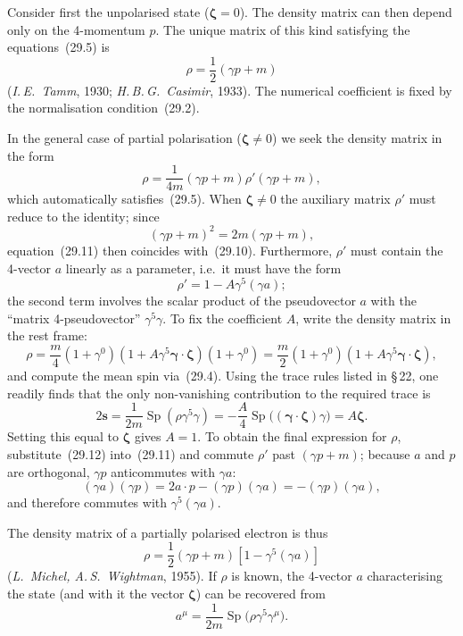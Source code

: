 Consider first the unpolarised state ($\boldsymbol{\zeta} = 0$). The density matrix can then depend only on the 4-momentum $p$. The unique matrix of this kind satisfying the equations~(29.5) is
\begin{equation}
\rho = \frac{1}{2}(\gamma p + m)
\tag{29.10}
\end{equation}
(\emph{I.\,E.~Tamm}, 1930; \emph{H.\,B.\,G.~Casimir}, 1933). The numerical coefficient is fixed by the normalisation condition~(29.2).


In the general case of partial polarisation ($\boldsymbol{\zeta} \neq 0$) we seek the density matrix in the form
\begin{equation}
\rho = \frac{1}{4m}(\gamma p + m)\rho'(\gamma p + m),
\tag{29.11}
\end{equation}
which automatically satisfies~(29.5). When $\boldsymbol{\zeta} \neq 0$ the auxiliary matrix $\rho'$ must reduce to the identity; since
\[
(\gamma p + m)^2 = 2m(\gamma p + m),
\]
equation~(29.11) then coincides with~(29.10). Furthermore, $\rho'$ must contain the 4-vector $a$ linearly as a parameter, i.e.\ it must have the form
\begin{equation}
\rho' = 1 - A\gamma^5(\gamma a);
\tag{29.12}
\end{equation}
the second term involves the scalar product of the pseudovector $a$ with the ``matrix 4-pseudovector'' $\gamma^5\gamma$. To fix the coefficient $A$, write the density matrix in the rest frame:
\[
\rho = \frac{m}{4}(1 + \gamma^0)(1 + A\gamma^5\boldsymbol{\gamma}\cdot\boldsymbol{\zeta})(1 + \gamma^0) = \frac{m}{2}(1 + \gamma^0)(1 + A\gamma^5\boldsymbol{\gamma}\cdot\boldsymbol{\zeta}),
\]
and compute the mean spin via~(29.4). Using the trace rules listed in \S\,22, one readily finds that the only non-vanishing contribution to the required trace is
\[
2\mathbf{s} = \frac{1}{2m}\operatorname{Sp}(\rho\gamma^5\gamma) = -\frac{A}{4}\operatorname{Sp}\bigl((\boldsymbol{\gamma}\cdot\boldsymbol{\zeta})\gamma\bigr) = A\boldsymbol{\zeta}.
\]
Setting this equal to $\boldsymbol{\zeta}$ gives $A = 1$. To obtain the final expression for $\rho$, substitute~(29.12) into~(29.11) and commute $\rho'$ past $(\gamma p + m)$; because $a$ and $p$ are orthogonal, $\gamma p$ anticommutes with $\gamma a$:
\[
(\gamma a)(\gamma p) = 2a\!\cdot\!p - (\gamma p)(\gamma a) = -(\gamma p)(\gamma a),
\]
and therefore commutes with $\gamma^5(\gamma a)$.

The density matrix of a partially polarised electron is thus
\begin{equation}
\rho = \frac{1}{2}(\gamma p + m)[1 - \gamma^5(\gamma a)]
\tag{29.13}
\end{equation}
(\emph{L.~Michel, A.\,S.~Wightman}, 1955). If $\rho$ is known, the 4-vector $a$ characterising the state (and with it the vector $\boldsymbol{\zeta}$) can be recovered from
\begin{equation}
a^\mu = \frac{1}{2m}\operatorname{Sp}\bigl(\rho\gamma^5\gamma^\mu\bigr).
\tag{29.14}
\end{equation}

